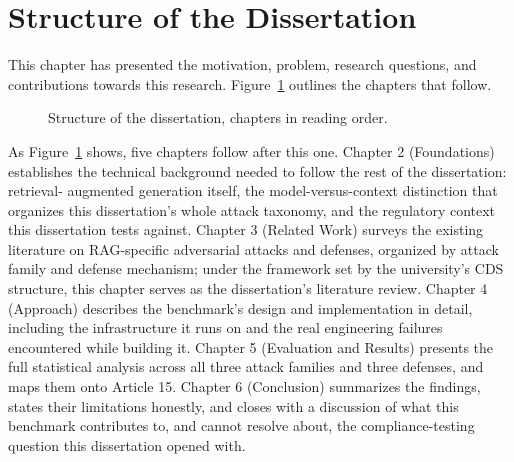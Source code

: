 \section{Structure of the Dissertation}

This chapter has presented the motivation, problem, research questions,
and contributions towards this research. Figure~\ref{fig:dissertation-structure}
outlines the chapters that follow.

\begin{figure}[htbp]
\centering
{}
\caption{Structure of the dissertation, chapters in reading order.}
\label{fig:dissertation-structure}
\end{figure}

As Figure~\ref{fig:dissertation-structure} shows, five chapters follow
after this one. Chapter 2 (Foundations) establishes the technical
background needed to follow the rest of the dissertation: retrieval-
augmented generation itself, the model-versus-context distinction that
organizes this dissertation's whole attack taxonomy, and the regulatory
context this dissertation tests against. Chapter 3 (Related Work)
surveys the existing literature on RAG-specific adversarial attacks and
defenses, organized by attack family and defense mechanism; under the
framework set by the university's CDS structure, this chapter serves as
the dissertation's literature review. Chapter 4 (Approach) describes the
benchmark's design and implementation in detail, including the
infrastructure it runs on and the real engineering failures encountered
while building it. Chapter 5 (Evaluation and Results) presents the full
statistical analysis across all three attack families and three
defenses, and maps them onto Article 15. Chapter 6 (Conclusion)
summarizes the findings, states their limitations honestly, and closes
with a discussion of what this benchmark contributes to, and cannot
resolve about, the compliance-testing question this dissertation opened
with.

